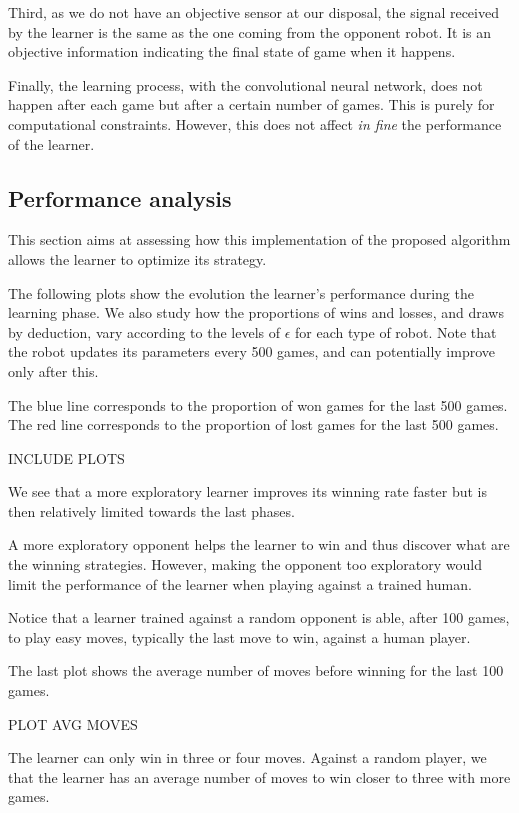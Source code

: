 \documentclass[scrartcl, 10.5 pt, conference]{ieeeconf}
\begin{document}
Third, as we do not have an objective sensor at our disposal, the signal received by the learner is the same as the one coming from the opponent robot. It is an objective information indicating the final state of game when it happens.

Finally, the learning process, with the convolutional neural network, does not happen after each game but after a certain number of games. This is purely for computational constraints. However, this does not affect \textit{in fine} the performance of the learner.

\subsection{Performance analysis}

This section aims at assessing how this implementation of the proposed algorithm allows the learner to optimize its strategy.

The following plots show the evolution the learner's performance during the learning phase. We also study how the proportions of wins and losses, and draws by deduction, vary according to the levels of $\epsilon$ for each type of robot. Note that the robot updates its parameters every 500 games, and can potentially improve only after this.

The blue line corresponds to the proportion of won games for the last 500 games. The red line corresponds to the proportion of lost games for the last 500 games.

INCLUDE PLOTS

We see that a more exploratory learner improves its winning rate faster but is then relatively limited towards the last phases.

A more exploratory opponent helps the learner to win and thus discover what are the winning strategies. However, making the opponent too exploratory would limit the performance of the learner when playing against a trained human.

Notice that a learner trained against a random opponent is able, after 100 games, to play easy moves, typically the last move to win, against a human player.

The last plot shows the average number of moves before winning for the last 100 games. 

PLOT AVG MOVES

The learner can only win in three or four moves. Against a random player, we that the learner has an average number of moves to win closer to three with more games.
\end{document}
